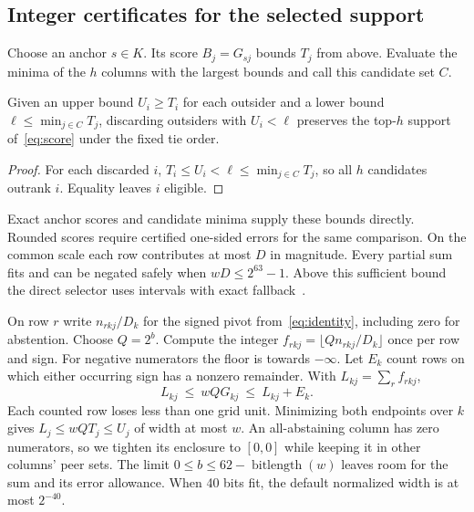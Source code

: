 \subsection{Integer certificates for the selected support}
Choose an anchor $s\in K$. Its score $B_j=G_{sj}$ bounds $T_j$ from above. Evaluate the minima of the $h$ columns with the largest bounds and call this candidate set $C$.

\begin{proposition}\label{prop:screen}
Given an upper bound $U_i\ge T_i$ for each outsider and a lower bound $\ell\le\min_{j\in C}T_j$, discarding outsiders with $U_i<\ell$ preserves the top-$h$ support of~\eqref{eq:score} under the fixed tie order.
\end{proposition}
\begin{proof}
For each discarded $i$, $T_i\le U_i<\ell\le\min_{j\in C}T_j$, so all $h$ candidates outrank $i$. Equality leaves $i$ eligible.
\end{proof}
Exact anchor scores and candidate minima supply these bounds directly. Rounded scores require certified one-sided errors for the same comparison.
On the common scale each row contributes at most $D$ in magnitude. Every partial sum fits and can be negated safely when $wD\le2^{63}-1$. Above this sufficient bound the direct selector uses intervals with exact fallback~\citep{shewchuk1997adaptive}.

On row $r$ write $n_{rkj}/D_k$ for the signed pivot from~\eqref{eq:identity}, including zero for abstention. Choose $Q=2^b$. Compute the integer $f_{rkj}=\lfloor Qn_{rkj}/D_k\rfloor$ once per row and sign. For negative numerators the floor is towards $-\infty$. Let $E_k$ count rows on which either occurring sign has a nonzero remainder. With $L_{kj}=\sum_r f_{rkj}$,
\begin{equation}
 L_{kj}\ \le\ wQG_{kj}\ \le\ L_{kj}+E_k. \label{eq:grid}
\end{equation}
Each counted row loses less than one grid unit. Minimizing both endpoints over $k$ gives $L_j\le wQT_j\le U_j$ of width at most $w$. An all-abstaining column has zero numerators, so we tighten its enclosure to $[0,0]$ while keeping it in other columns' peer sets. The limit $0\le b\le62-\operatorname{bitlength}(w)$ leaves room for the sum and its error allowance. When 40 bits fit, the default normalized width is at most $2^{-40}$.


